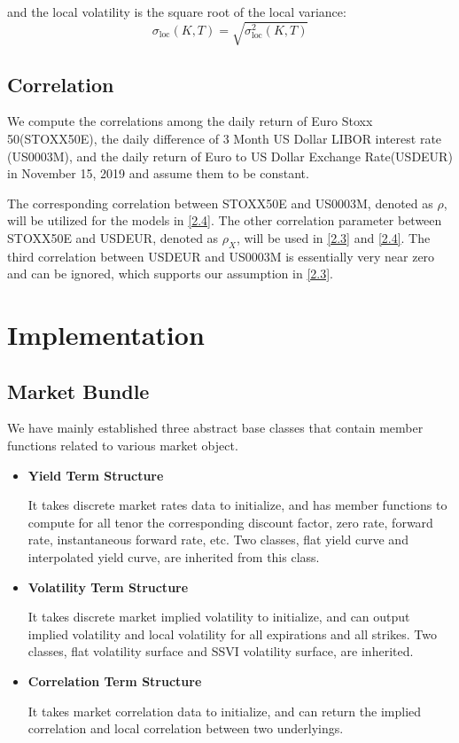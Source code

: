 \documentclass[11pt]{article}
\numberwithin{equation}{section}
\theoremstyle{remark}
\begin{document}
and the local volatility is the square root of the local variance:
$$\sigma_{\mathrm{loc}}(K, T) = \sqrt{\sigma_{\mathrm{loc}}^2(K, T)}$$


\subsection{Correlation}\label{3.6}
We compute the correlations among the daily return of Euro Stoxx 50(STOXX50E), the daily difference of 3 Month US Dollar LIBOR interest rate (US0003M), and the daily return of Euro to US Dollar Exchange Rate(USDEUR) in November 15, 2019 and assume them to be constant.

The corresponding correlation between STOXX50E and US0003M, denoted as $\rho$, will be utilized for the models in \ref{2.4}. The other correlation parameter between STOXX50E and USDEUR, denoted as $\rho_X$, will be used in \ref{2.3} and \ref{2.4}. The third correlation between USDEUR and US0003M is essentially very near zero and can be ignored, which supports our assumption in \ref{2.3}.

\section{Implementation}\label{4}
\subsection{Market Bundle}\label{4.1}
We have mainly established three abstract base classes that contain member functions related to various market object.

\begin{itemize}
\item \textbf{Yield Term Structure}

It takes discrete market rates data to initialize, and has member functions to compute for all tenor the corresponding discount factor, zero rate, forward rate, instantaneous forward rate, etc. Two classes, flat yield curve and interpolated yield curve, are inherited from this class.

\item \textbf{Volatility Term Structure}

It takes discrete market implied volatility to initialize, and can output implied volatility and local volatility for all expirations and all strikes. Two classes, flat volatility surface and SSVI volatility surface, are inherited.

\item \textbf{Correlation Term Structure}

It takes market correlation data to initialize, and can return the implied correlation and local correlation between two underlyings.
\end{itemize}
\end{document}
